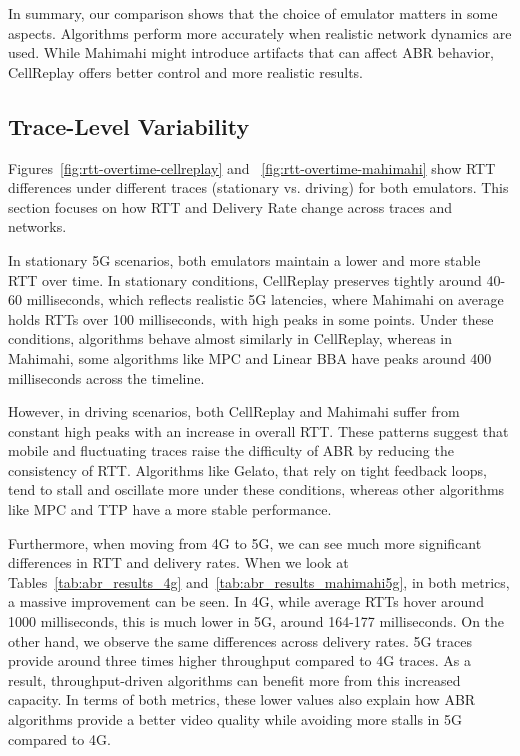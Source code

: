 In summary, our comparison shows that the choice of emulator matters in some aspects. Algorithms perform more accurately when realistic network dynamics are used. While Mahimahi might introduce artifacts that can affect ABR behavior, CellReplay offers better control and more realistic results.

\subsection{Trace-Level Variability}

Figures~\ref{fig:rtt-overtime-cellreplay} and ~\ref{fig:rtt-overtime-mahimahi} show RTT differences under different traces (stationary vs. driving) for both emulators. This section focuses on how RTT and Delivery Rate change across traces and networks.

In stationary 5G scenarios, both emulators maintain a lower and more stable RTT over time. In stationary conditions, CellReplay preserves tightly around 40-60 milliseconds, which reflects realistic 5G latencies, where Mahimahi on average holds RTTs over 100 milliseconds, with high peaks in some points. Under these conditions, algorithms behave almost similarly in CellReplay, whereas in Mahimahi, some algorithms like MPC and Linear BBA have peaks around 400 milliseconds across the timeline. 

However, in driving scenarios, both CellReplay and Mahimahi suffer from constant high peaks with an increase in overall RTT. These patterns suggest that mobile and fluctuating traces raise the difficulty of ABR by reducing the consistency of RTT. Algorithms like Gelato, that rely on tight feedback loops, tend to stall and oscillate more under these conditions, whereas other algorithms like MPC and TTP have a more stable performance.

Furthermore, when moving from 4G to 5G, we can see much more significant differences in RTT and delivery rates. When we look at Tables~\ref{tab:abr_results_4g} and~\ref{tab:abr_results_mahimahi5g}, in both metrics, a massive improvement can be seen. In 4G, while average RTTs hover around 1000 milliseconds, this is much lower in 5G, around 164-177 milliseconds. On the other hand, we observe the same differences across delivery rates. 5G traces provide around three times higher throughput compared to 4G traces. As a result, throughput-driven algorithms can benefit more from this increased capacity. In terms of both metrics, these lower values also explain how ABR algorithms provide a better video quality while avoiding more stalls in 5G compared to 4G. 

